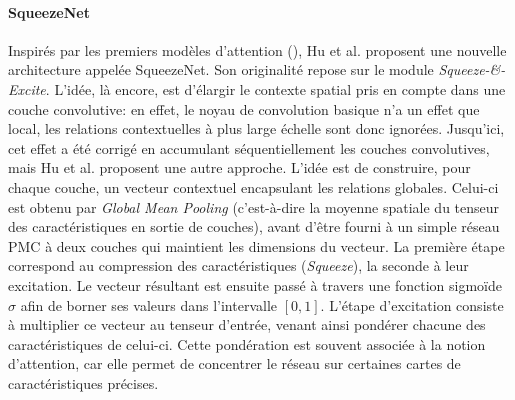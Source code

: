 \paragraph{SqueezeNet}
\label{par:squeezeNet}
Inspirés par les premiers modèles d'attention (\cite{wangResidualAttentionNetwork2017}), Hu et al. \cite{huSqueezeandExcitationNetworks2018} proposent une nouvelle architecture appelée SqueezeNet. Son originalité repose sur le module \textit{Squeeze-\&-Excite}. L'idée, là encore, est d'élargir le contexte spatial pris en compte dans une couche convolutive: en effet, le noyau de convolution basique n'a un effet que local, les relations contextuelles à plus large échelle sont donc ignorées. Jusqu'ici, cet effet a été corrigé en accumulant séquentiellement les couches convolutives, mais Hu et al. proposent une autre approche. L'idée est de construire, pour chaque couche, un vecteur contextuel encapsulant les relations globales. Celui-ci est obtenu par \textit{Global Mean Pooling} (c'est-à-dire la moyenne spatiale du tenseur des caractéristiques en sortie de couches), avant d'être fourni à un simple réseau \ac{PMC} à deux couches qui maintient les dimensions du vecteur. La première étape correspond au compression des caractéristiques (\textit{Squeeze}), la seconde à leur excitation. Le vecteur résultant est ensuite passé à travers une fonction sigmoïde $\sigma$ afin de borner ses valeurs dans l'intervalle $\left[ 0, 1\right]$. L'étape d'excitation consiste à multiplier ce vecteur au tenseur d'entrée, venant ainsi pondérer chacune des caractéristiques de celui-ci. Cette pondération est souvent associée à la notion d'attention, car elle permet de concentrer le réseau sur certaines cartes de caractéristiques précises. 

